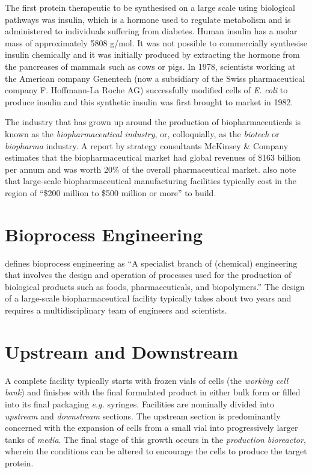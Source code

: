 The first protein therapeutic to be synthesised on a large scale using 
biological pathways was insulin, which is a hormone used to regulate metabolism
and is administered to individuals suffering from diabetes.
Human insulin has a molar mass of approximately 5808 g/mol.
It was not possible to commercially synthesise insulin chemically and it was
initially produced by extracting the hormone from the pancreases of mammals
such as cows or pigs.
In 1978, scientists working at  the American company Genentech (now a
subsidiary of the Swiss pharmaceutical company F. Hoffmann-La Roche AG)
successfully modified cells of \textit{E. coli} to produce insulin and this
synthetic insulin was first brought to market in 1982.

The industry that has grown up around the production of biopharmaceuticals is 
known as the \emph{biopharmaceutical industry}, or, colloquially, as the
\emph{biotech} or \emph{biopharma} industry.
A report by strategy consultants McKinsey \& Company \citep{Otto:2014}
estimates that the biopharmaceutical market had global revenues of
\$163 billion per annum and was worth 20\% of the overall pharmaceutical
market.
\citet{Otto:2014} also note that large-scale biopharmaceutical manufacturing
facilities typically cost in the region of 
``\$200 million to \$500 million or more'' to build.

\section{Bioprocess Engineering}\label{SS.bioproceng}

\citet{Schaschke:2014} defines bioprocess engineering as ``A specialist branch
of (chemical) engineering that involves the design and operation of processes
used for the production of biological products such as foods, pharmaceuticals,
and biopolymers.''  
The design of a large-scale biopharmaceutical facility typically takes about
two years and requires a multidisciplinary team of engineers and scientists.

\section{Upstream and Downstream}\label{SS.updown}

A complete facility typically starts with frozen vials of cells (the 
\emph{working cell bank}) and finishes with the final formulated product in
either bulk form or filled into its final packaging \textit{e.g.} syringes.
Facilities are nominally divided into \emph{upstream} and \emph{downstream} 
sections.
The upstream section is predominantly concerned with the expansion of cells
from a small vial into progressively larger tanks of \emph{media}.  
The final stage of this growth occurs in the \emph{production bioreactor}, 
wherein the conditions can be altered to encourage the cells to produce the 
target protein.

